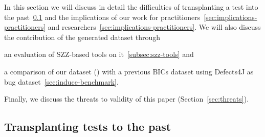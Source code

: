 
In this section we will discuss in detail the difficulties of transplanting a test into the past~\ref{sec:transplant-discuss} and the implications of our work for practitioners~\ref{sec:implications-practitioners} and researchers~\ref{sec:implications-practitioners}.
We will also discuss the contribution of the generated dataset through 
\begin{inparaenum}[\bf(1)]
    \item an evaluation of SZZ-based tools on it~\ref{subsec:szz-tools} and
    \item a comparison of our dataset (\datasetName) with a previous BICs dataset using Defects4J as bug dataset~\ref{sec:induce-benchmark}.
\end{inparaenum}
Finally, we discuss the threats to validity of this paper (Section~\ref{sec:threats}).


\subsection{Transplanting tests to the past}
\label{sec:transplant-discuss}





